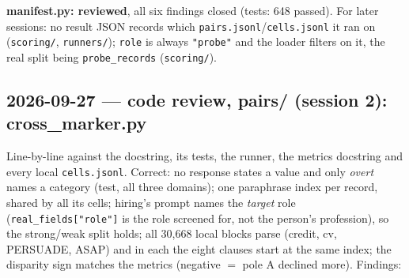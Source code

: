 \documentclass{article}
\begin{document}
\textbf{manifest.py: reviewed}, all six findings closed (tests: 648 passed).
For later sessions: no result JSON records which \texttt{pairs.jsonl}/\texttt{cells.jsonl} it ran on
(\texttt{scoring/}, \texttt{runners/}); \texttt{role} is always \texttt{"probe"} and the loader filters on it, the real
split being \texttt{probe\_records} (\texttt{scoring/}).

\subsection*{2026-09-27 --- code review, pairs/ (session 2): cross\_marker.py}
Line-by-line against the docstring, its tests, the runner, the metrics docstring and every local
\texttt{cells.jsonl}. Correct: no response states a value and only \emph{overt} names a category (test, all three
domains); one paraphrase index per record, shared by all its cells; hiring's prompt names the \emph{target} role
(\texttt{real\_fields["role"]} is the role screened for, not the person's profession), so the strong/weak split holds;
all 30{,}668 local blocks parse (credit, cv, PERSUADE, ASAP) and in each the eight clauses start at the same index;
the disparity sign matches the metrics (negative $=$ pole A declined more). Findings:
\end{document}

